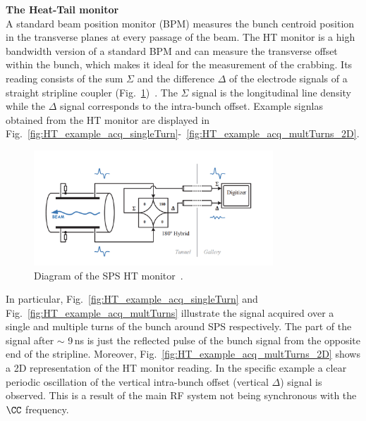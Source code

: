 \normalsize{\textbf{The Heat-Tail monitor}}\\
A standard beam position monitor (BPM) measures the bunch centroid position in the transverse planes at every passage of the beam. The HT monitor is a high bandwidth version of a standard BPM and can measure the transverse offset within the bunch, which makes it ideal for the measurement of the crabbing. Its reading consists of the sum $\Sigma$ and the  difference $\Delta$ of the electrode signals of a straight stripline coupler (Fig.~\ref{fig:SPS_HT_diagram})~\cite{Jones:987561, Levens:2313358}. The $\Sigma$ signal is the longitudinal line density while the $\Delta$ signal corresponds to the intra-bunch offset. Example signlas obtained from the HT monitor are displayed in Fig.~\ref{fig:HT_example_acq_singleTurn}-~\ref{fig:HT_example_acq_multTurns_2D}.

\begin{figure}[!h]
   \centering         
   \includegraphics[width=0.8\textwidth]{images/Ch4/SPS_HT_monitor_diagram_modified.png}
       \caption{Diagram of the SPS HT monitor~\cite{Levens:2313358}.}
       \label{fig:SPS_HT_diagram}
\end{figure}


In particular, Fig.~\ref{fig:HT_example_acq_singleTurn} and Fig.~\ref{fig:HT_example_acq_multTurns} illustrate the signal acquired over a single and multiple turns of the bunch around SPS respectively. The part of the signal after $\sim$ 9\,ns is just the reflected pulse of the bunch signal from the opposite end of the stripline. Moreover, Fig.~\ref{fig:HT_example_acq_multTurns_2D} shows a 2D representation of the HT monitor reading. In the specific example a clear periodic oscillation of the vertical intra-bunch offset (vertical $\Delta$) signal is observed. This is a result of the main RF system not being synchronous with the  $\CC$  frequency. 

